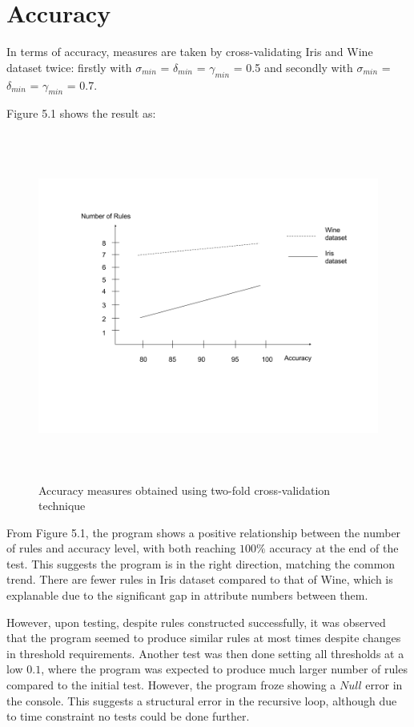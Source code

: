 \section{Accuracy}

In terms of accuracy, measures are taken by cross-validating Iris and Wine dataset twice: firstly with $\sigma_{min}$ = $\delta_{min}$ = $\gamma_{min}$ = 0.5 and secondly with $\sigma_{min}$ = $\delta_{min}$ = $\gamma_{min}$ = 0.7.

Figure 5.1 shows the result as:

\begin{figure}[h]
    \centering
    \includegraphics[width=5.5in, height=4.5in]{figures/test1}
    \caption[Accuracy measures obtained using two-fold cross-validation technique]{Accuracy measures obtained using two-fold cross-validation technique}
    \label{fig:figure5_1}
\end{figure}

From Figure 5.1, the program shows a positive relationship between the number of rules and accuracy level, with both reaching $100\%$ accuracy at the end of the test. This suggests the program is in the right direction, matching the common trend. There are fewer rules in Iris dataset compared to that of Wine, which is explanable due to the significant gap in attribute numbers between them. 

However, upon testing, despite rules constructed successfully, it was observed that the program seemed to produce similar rules at most times despite changes in threshold requirements. Another test was then done setting all thresholds at a low $0.1$, where the program was expected to produce much larger number of rules compared to the initial test. However, the program froze showing a $Null$ error in the console. This suggests a structural error in the recursive loop, although due to time constraint no tests could be done further.






